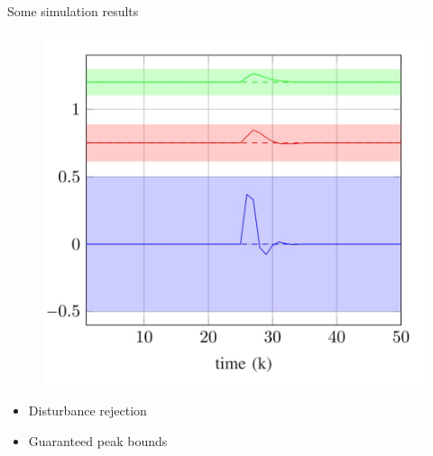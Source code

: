 \begin{frame}{Some simulation results}
	\begin{minipage}{0.45\textwidth}	
		\begin{figure}
			\includegraphics[width=1\textwidth]{doc/2_Formation_control/dist_rejection.jpg}
		\end{figure}
		\begin{itemize}
			\item Disturbance rejection 
			\item Guaranteed peak bounds
		\end{itemize}		
	\end{minipage}
	\begin{minipage}{0.45\textwidth}	
		\begin{figure}

\end{figure}
\end{minipage}
\end{frame}
